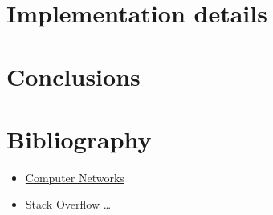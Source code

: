 \documentclass[paper=a4, fontsize=11pt]{scrartcl}
\begin{document}
\section{Implementation details}


\section{Conclusions}

\section{Bibliography}

\begin{itemize}  
\item \href{https://profs.info.uaic.ro/~computernetworks/index.php}{Computer Networks}
\item Stack Overflow
\ldots 
\end{itemize}
\end{document}
